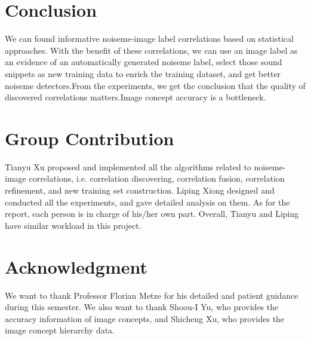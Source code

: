 \documentclass[conference, 11pt, onecolumn]{IEEEtran}
\begin{document}
\section{Conclusion}
We can found informative noiseme-image label correlations based on statistical approaches.
With the benefit of these correlations, we can use an image label as an evidence of an automatically generated noiseme label, select those sound snippets as new training data to enrich the training dataset, and get better noiseme detectors.From the experiments, we get the conclusion that the quality of discovered correlations matters.Image concept accuracy is a bottleneck.

\section{Group Contribution}
Tianyu Xu proposed and implemented all the algorithms related to noiseme-image correlations, i.e. correlation discovering, correlation fusion, correlation refinement, and new training set construction. Liping Xiong designed and conducted all the experiments, and gave detailed analysis on them. As for the report, each person is in charge of his/her own part. Overall, Tianyu and Liping have similar workload in this project.

\section*{Acknowledgment}
We want to thank Professor Florian Metze for his detailed and patient guidance during this semester. We also want to thank Shoou-I Yu, who provides the accuracy information of image concepts, and Shicheng Xu, who provides the image concept hierarchy data.



\end{document}
